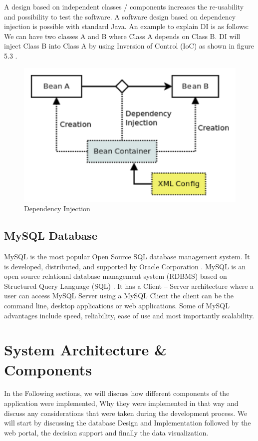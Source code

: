 A design based on independent classes / components increases the re-usability and possibility to test the software. A software design based on dependency injection is possible with standard Java. An example to explain DI is as follows:\\
We can have two classes A and B where Class A depends on Class B. DI will inject Class B into Class A by using Inversion of Control (IoC) as shown in figure 5.3 \cite{DI}.
\begin{figure}[H]
\centering
\includegraphics[scale=0.5]{Images/DI.png}
\caption[Dependency Injection]{Dependency Injection \cite{DI}}
\end{figure}
\subsection{MySQL Database}
MySQL is the most popular Open Source SQL database management system. It is developed, distributed, and supported by Oracle Corporation \cite{WhatisMySQL}. MySQL is an open source relational database management system (RDBMS) based on Structured Query Language (SQL) \cite{MySQL}. It has a Client – Server architecture where a user can access MySQL Server using a MySQL Client the client can be the command line, desktop applications or web applications. Some of MySQL advantages include speed, reliability, ease of use and most importantly scalability. 
\section{System Architecture \& Components}
\label{SystemArchitectureAndCompronents}
In the Following sections, we will discuss how different components of the application were implemented, Why they were implemented in that way and discuss any considerations that were taken during the development process. We will start by discussing the database Design and Implementation followed by the web portal, the decision support and finally the data visualization.
